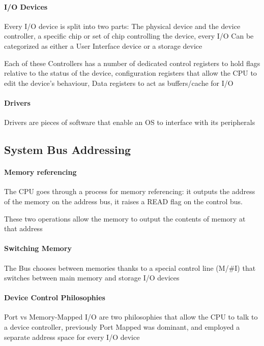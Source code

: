 \documentclass[openright, twoside]{report}
\theoremstyle{definition}
\theoremstyle{example}
\begin{document}
		
		\paragraph{I/O Devices} Every I/O device is split into two parts: The physical 
		device and the device controller, a specific chip or set of chip controlling the 
		device, every I/O Can be categorized as either a User Interface device or a storage device
		
		Each of these Controllers has a number of dedicated control registers to hold 
		flags relative to the status of the device, configuration registers that allow 
		the CPU to edit the device's behaviour, Data registers to act as buffers/cache for I/O
		
		\paragraph{Drivers} Drivers are pieces of software that enable an OS to interface with its peripherals
		
		\subsection{System Bus Addressing}
		\paragraph{Memory referencing} The CPU goes through a process for memory 
		referencing: it outputs the address of the memory on the address bus, 
		it raises a READ flag on the control bus.
		
		These two operations allow the memory to output the contents of memory at that address
		
		\paragraph{Switching Memory} The Bus chooses between memories thanks to a 
		special control line (M/\#I) that switches between main memory and storage I/O devices
		
		\paragraph{Device Control Philosophies} Port vs Memory-Mapped I/O are 
		two philosophies that allow the CPU to talk to a device controller, 
		previously Port Mapped was dominant, and employed a separate address space for every I/O device
		
\end{document}
